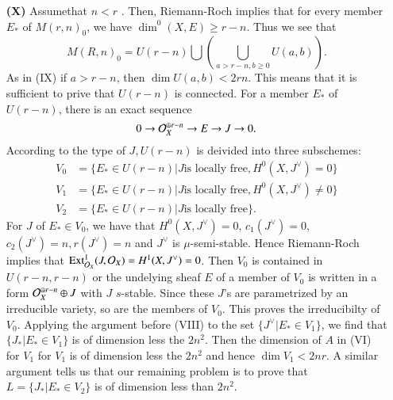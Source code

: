 \begin{itemize}
\item [\bf(X)] Assume\pageoriginale that $n < r$ . Then, Riemann-Roch implies that for every member $E_{*}$ of $M(r, n)_{0}$, we have
 $\dim^{0}(X, E) \geq r-n$. Thus we see that
 $$
 M(R, n)_{0} = U(r-n)\bigcup \left(\bigcup\limits_{a>r-n,b\geq 0} U(a, b)\right).
 $$
As in (IX) if $a > r-n$, then $\dim U(a, b)< 2rn$. This  means that it is sufficient to prive that $U(r-n)$ is connected. For a member $E_{*}$ of $U(r-n)$, there is an exact sequence
$$
0 \rightarrow \mathcal{O}_{X}^{\oplus r-n} \rightarrow E\rightarrow J \rightarrow 0.
$$
According to the type of $J, U(r-n)$ is deivided into three subschemes:
\begin{align*}
V_{0}&=\{E_{*} \in U(r-n) | J \text{is locally free}, H^{0}(X, J^{\vee})=0\}\\
V_{1}&=\{E_{*} \in U(r-n) | J \text{is locally free}, H^{0}(X, J^{\vee})\neq 0\}\\
V_{2}&=\{E_{*} \in U(r-n) | J \text{is locally free} \}.
\end{align*}
For $J$ of $E_{*} \in V_{0}$, we have that $H^{0}(X, J^{\vee})=0$, $c_{1}(J^{\vee})=0$, $c_{2}(J^{\vee})=n, r(J^{\vee})=n$ and $J^{\vee}$ is $\mu$-semi-stable. Hence Riemann-Roch implies that $\operatorname{Ext}_{\mathcal{O}_{X}}^{1}(J, \mathcal{O}_{X})=H^{1}(X, J^{\vee})=0$. Then $V_{0}$ is contained in $U(r-n, r-n)$ or the undelying sheaf $E$ of a member of $V_{0}$ is written in a form $\mathcal{O}_{X}^{\oplus r-n} \oplus J$ with $J$  $s$-stable. Since these $J$'s are parametrized by an irreducible variety, so are the members of $V_{0}$. This proves the irreducibilty of $V_{0}$. Applying the argument before (VIII) to the set $\{J^{\vee} | E_{*} \in V_{1}\}$, we find that $\{J_{*} | E_{*} \in V_{1}\}$ is of dimension less the $2n^{2}$. Then the dimension of $A$ in (VI) for $V_{1}$ for $V_{1}$ is of dimension less the $2n^{2}$ and hence $\dim V_{1}< 2nr$. A similar argument tells us that our remaining problem is to prove that $L=\{J_{*} |E_{*} \in V_{2}\}$ is of dimension less than $2n^{2}$.


\end{itemize}
